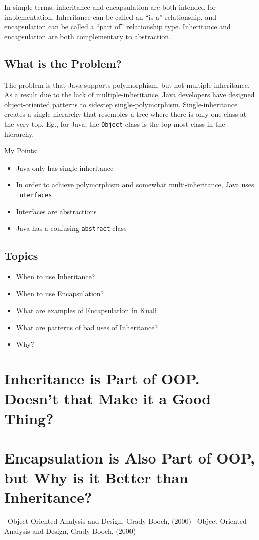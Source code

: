 \documentclass[12pt,notitlepage]{article}
\begin{document}
  In simple terms, inheritance and encapsulation are both intended for implementation. Inheritance can be called an ``is a'' relationship, and
  encapsulation can be called a ``part of'' relationship type. Inheritance and encapsulation are both complementary to abstraction.

  \subsection{What is the Problem?}
  The problem is that Java supports polymorphism, but not multiple-inheritance. As a result due to the lack of multiple-inheritance, Java 
  developers have designed object-oriented patterns to sidestep single-polymorphism. Single-inheritance creates a single hierarchy that 
  resembles a tree where there is only one class at the very top. Eg., for \sf Java\rm, the \texttt{Object} class is the top-most class in the hierarchy.
  
  My Points:
  \begin{itemize}
    \item Java only has single-inheritance
    \item In order to achieve polymorphism and somewhat multi-inheritance, Java uses \texttt{interfaces}.
    \item Interfaces are abstractions
    \item Java has a confusing \texttt{abstract} class
  \end{itemize}
  \subsection{Topics}
  \begin{itemize}
    \item When to use Inheritance?
    \item When to use Encapsulation?
    \item What are examples of Encapsulation in Kuali
    \item What are patterns of bad uses of Inheritance?
    \item Why?
  \end{itemize}

  \section{\hfill Inheritance is Part of OOP. Doesn't that Make it a Good Thing?}
  \hrulefill

  \section{\hfill Encapsulation is Also Part of OOP, but Why is it Better than Inheritance?}
  \hrulefill
  \begin{thebibliography}{20}
     ~Object-Oriented Analysis and Design, Grady Booch, (2000) 
     ~Object-Oriented Analysis and Design, Grady Booch, (2000) 
  \end{thebibliography}
\end{document}
